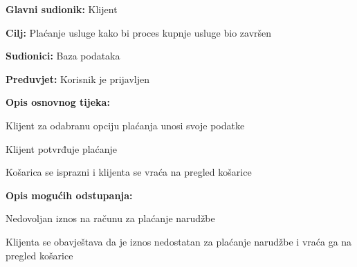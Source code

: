 				\noindent {}
				\begin{packed_item}
					
					\item \textbf{Glavni sudionik: } Klijent
					\item  \textbf{Cilj:} Plaćanje usluge kako bi proces kupnje usluge bio završen
					\item  \textbf{Sudionici:} Baza podataka
					\item  \textbf{Preduvjet:} Korisnik je prijavljen
					\item  \textbf{Opis osnovnog tijeka:}
					
					\item[] \begin{packed_enum}
						
						\item Klijent za odabranu opciju plaćanja unosi svoje podatke
						\item Klijent potvrđuje plaćanje
						\item Košarica se isprazni i klijenta se vraća na pregled košarice
					\end{packed_enum}
					
					\item  \textbf{Opis mogućih odstupanja:}
					
					\item[] \begin{packed_item}
						
						\item[2.a] Nedovoljan iznos na računu za plaćanje narudžbe
						\item[] \begin{packed_enum}
							
							\item Klijenta se obavještava da je iznos nedostatan za plaćanje narudžbe i vraća ga na pregled košarice
							
						\end{packed_enum}
						
					\end{packed_item}
				\end{packed_item}
			
